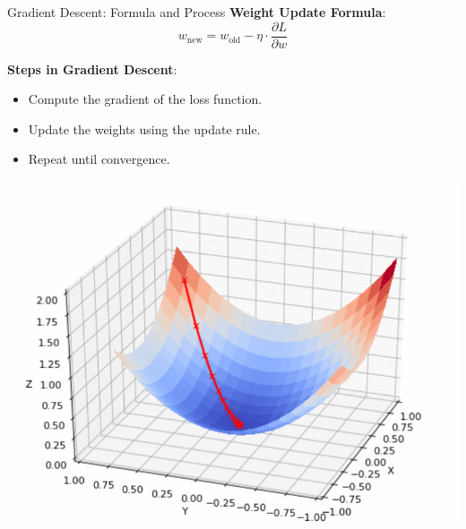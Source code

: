 \documentclass[serif, aspectratio=169]{beamer}
\begin{document}
\begin{frame}{Gradient Descent: Formula and Process}
    \textbf{Weight Update Formula}:
    \[
    w_{\text{new}} = w_{\text{old}} - \eta \cdot \frac{\partial L}{\partial w}
    \]

    \textbf{Steps in Gradient Descent}:
    \begin{itemize}
        \item Compute the gradient of the loss function.
        \item Update the weights using the update rule.
        \item Repeat until convergence.
    \end{itemize}
    
    \vspace{-2cm} %
    \begin{flushright}
        \includegraphics[scale=0.3]{pic/GD.png} %
    \end{flushright}

\end{frame}
\end{document}
